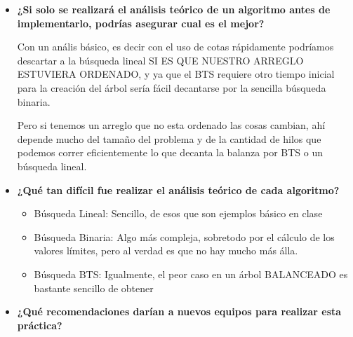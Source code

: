 \documentclass[12pt, fleqn]{article}                             %
\theoremstyle{break}                                            %
\begin{document}
\begin{itemize}
            \item
                \textbf{¿Si solo se realizará el análisis teórico de un algoritmo antes de
                implementarlo, podrías asegurar cual es el mejor?}

                Con un anális básico, es decir con el uso de cotas rápidamente podríamos descartar a
                la búsqueda lineal SI ES QUE NUESTRO ARREGLO ESTUVIERA ORDENADO, y ya que el BTS
                requiere otro tiempo inicial para la creación del árbol sería fácil decantarse por
                la sencilla búsqueda binaria.

                Pero si tenemos un arreglo que no esta ordenado las cosas cambian, ahí depende mucho
                del tamaño del problema y de la cantidad de hilos que podemos correr eficientemente
                lo que decanta la balanza por BTS o un búsqueda lineal.

            \item
                \textbf{¿Qué tan difícil fue realizar el análisis teórico de cada algoritmo?}

                \begin{itemize}
                    \item Búsqueda Lineal: Sencillo, de esos que son ejemplos básico en clase
                    \item Búsqueda Binaria: Algo más compleja, sobretodo por el cálculo de los
                    valores límites, pero al verdad es que no hay mucho más álla.
                    \item Búsqueda BTS: Igualmente, el peor caso en un árbol BALANCEADO es bastante sencillo
                    de obtener

                \end{itemize}

            \clearpage

            \item 
                \textbf{¿Qué recomendaciones darían a nuevos equipos para realizar esta práctica?}
                

\end{itemize}
\end{document}

